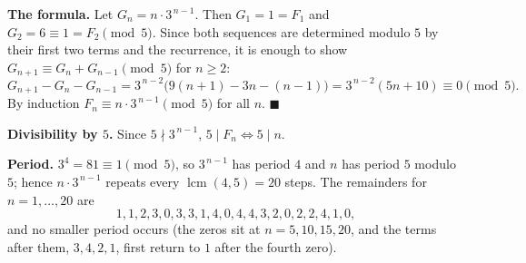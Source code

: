 \textbf{The formula.} Let $G_n=n\cdot3^{\,n-1}$. Then $G_1=1=F_1$ and $G_2=6\equiv1=F_2\pmod5$. Since both sequences are determined modulo $5$ by their first two terms and the recurrence, it is enough to show $G_{n+1}\equiv G_n+G_{n-1}\pmod5$ for $n\ge2$:
\[G_{n+1}-G_n-G_{n-1}=3^{\,n-2}\bigl(9(n+1)-3n-(n-1)\bigr)=3^{\,n-2}(5n+10)\equiv0\pmod5 .\]
By induction $F_n\equiv n\cdot3^{\,n-1}\pmod5$ for all $n$. $\blacksquare$

\textbf{Divisibility by $5$.} Since $5\nmid3^{\,n-1}$, $5\mid F_n\iff5\mid n$.

\textbf{Period.} $3^4=81\equiv1\pmod5$, so $3^{\,n-1}$ has period $4$ and $n$ has period $5$ modulo $5$; hence $n\cdot3^{\,n-1}$ repeats every $\operatorname{lcm}(4,5)=20$ steps. The remainders for $n=1,\ldots,20$ are
\[1,1,2,3,0,3,3,1,4,0,4,4,3,2,0,2,2,4,1,0,\]
and no smaller period occurs (the zeros sit at $n=5,10,15,20$, and the terms after them, $3,4,2,1$, first return to $1$ after the fourth zero).
